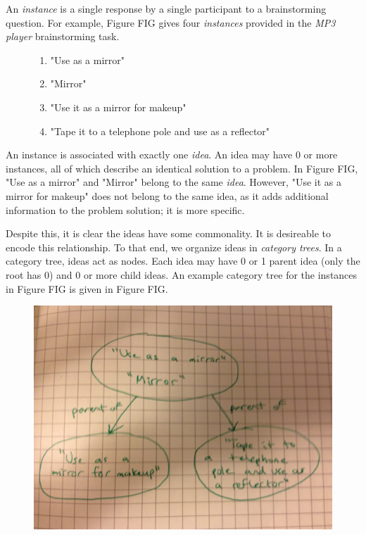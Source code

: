 An \emph{instance} is a single response by a single participant to a brainstorming question. For example, Figure FIG gives four \emph{instances} provided in the \emph{MP3 player} brainstorming task.

\begin{figure}[!h]
    \begin{enumerate}
        \item "Use as a mirror"
        \item "Mirror"
        \item "Use it as a mirror for makeup"
        \item "Tape it to a telephone pole and use as a reflector"
    \end{enumerate}
\end{figure}

An instance is associated with exactly one \emph{idea}. An idea may have 0 or more instances, all of which describe an identical solution to a problem. In Figure FIG, "Use as a mirror" and "Mirror" belong to the same \emph{idea}. However, "Use it as a mirror for makeup" does not belong to the same idea, as it adds additional information to the problem solution; it is more specific.

Despite this, it is clear the ideas have some commonality. It is desireable to encode this relationship. To that end, we organize ideas in \emph{category trees}. In a category tree, ideas act as nodes. Each idea may have 0 or 1 parent idea (only the root has 0) and 0 or more child ideas. An example category tree for the instances in Figure FIG is given in Figure FIG.

\begin{figure}[!h]
    \centering
    \includegraphics[width=0.9\columnwidth]{sample_category_tree}
\end{figure}

